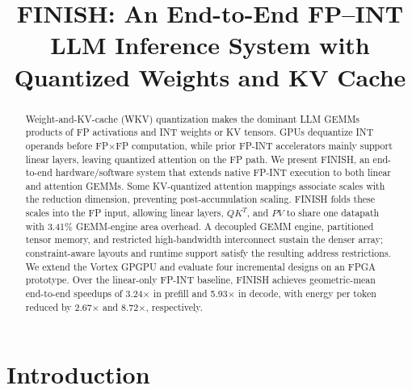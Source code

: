 \documentclass[sigconf,anonymous,nonacm]{acmart}
\title[FINISH: An End-to-End FP--INT LLM Inference System]{FINISH: An End-to-End FP–INT LLM Inference System with Quantized Weights and KV Cache}
\newcommand{\ours}{\textsc{FINISH}}
\newcommand{\fpint}{FP-INT}
\begin{document}
\begin{abstract}
Weight-and-KV-cache (WKV) quantization makes the dominant LLM GEMMs products of FP activations and INT weights or KV tensors. GPUs dequantize INT operands before FP$\times$FP computation, while prior \fpint{} accelerators mainly support linear layers, leaving quantized attention on the FP path. We present \ours{}, an end-to-end hardware/software system that extends native \fpint{} execution to both linear and attention GEMMs. Some KV-quantized attention mappings associate scales with the reduction dimension, preventing post-accumulation scaling. \ours{} folds these scales into the FP input, allowing linear layers, $QK^T$, and $PV$ to share one datapath with 3.41\% GEMM-engine area overhead. A decoupled GEMM engine, partitioned tensor memory, and restricted high-bandwidth interconnect sustain the denser array; constraint-aware layouts and runtime support satisfy the resulting address restrictions. We extend the Vortex GPGPU and evaluate four incremental designs on an FPGA prototype. Over the linear-only \fpint{} baseline, \ours{} achieves geometric-mean end-to-end speedups of 3.24$\times$ in prefill and 5.93$\times$ in decode, with energy per token reduced by 2.67$\times$ and 8.72$\times$, respectively.


\end{abstract}

\maketitle

\section{Introduction}
\end{document}
